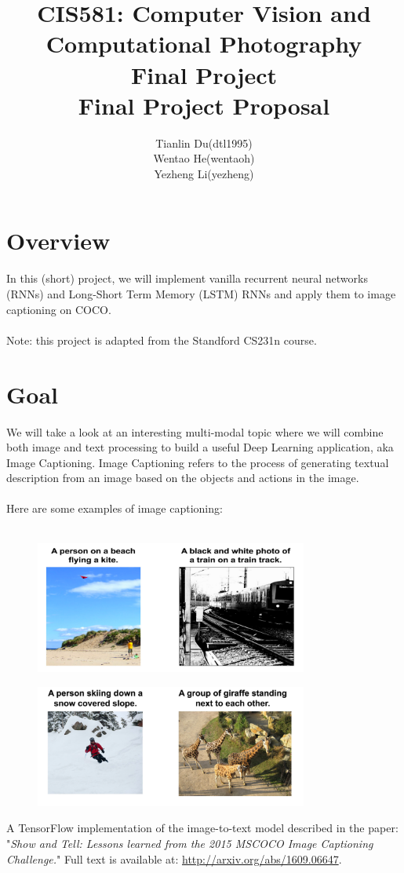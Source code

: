 \documentclass[english]{article}
\title{CIS581: Computer Vision and Computational Photography\\Final Project\\Final Project Proposal}
\author{%
 \begin{tabular}{rl}
 Tianlin Du&(dtl1995) \tabularnewline
  Wentao He&(wentaoh) \tabularnewline
  Yezheng Li&(yezheng)
\end{tabular}
}
\begin{document}
\maketitle

\section{Overview}
In this (short) project, we will implement vanilla recurrent neural networks (RNNs) and Long-Short Term Memory (LSTM) RNNs and apply them to image captioning on COCO.\\\\
Note: this project is adapted from the Standford CS231n course.

\section{Goal}
We will take a look at an interesting multi-modal topic where we will combine both image and text processing to build a useful Deep Learning application, aka Image Captioning. Image Captioning refers to the process of generating textual description from an image based on the objects and actions in the image.\\\\
Here are some examples of image captioning:\\\\
        \begin{figure}[H]
          \centering
          \includegraphics[width=0.8\textwidth]{Picture1.png}
          \caption{}
        \end{figure}
        \begin{figure}[H]
          \centering
          \includegraphics[width=0.8\textwidth]{Picture2.png}
          \caption{}
        \end{figure}
A TensorFlow implementation of the image-to-text model described in the paper: "\textit{Show and Tell: Lessons learned from the 2015 MSCOCO Image Captioning Challenge.}" Full text is available at: \url{http://arxiv.org/abs/1609.06647}.
\end{document}
